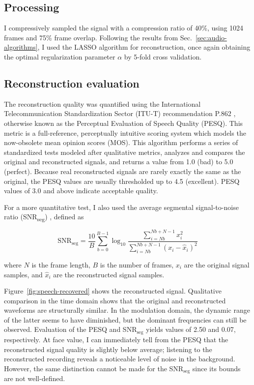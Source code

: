 \subsection{Processing}
\label{ssec:audio-speech-process}
I compressively sampled the signal with a compression ratio of 40\%, using 1024 frames and 75\% frame overlap. Following the results from Sec.~\ref{sec:audio-algorithms}, I used the LASSO algorithm for reconstruction, once again obtaining the optimal regularization parameter $\alpha$ by 5-fold cross validation.

\subsection{Reconstruction evaluation}
\label{ssec:audio-speech-metric}
The reconstruction quality was quantified using the International Telecommunication Standardization Sector (ITU-T) recommendation P.862 \cite{pesq}, otherwise known as the Perceptual Evaluation of Speech Quality (PESQ). This metric is a full-reference, perceptually intuitive scoring system which models the now-obsolete mean opinion scores (MOS). This algorithm performs a series of standardized tests modeled after qualitative metrics, analyzes and compares the original and reconstructed signals, and returns a value from 1.0 (bad) to 5.0 (perfect). Because real reconstructed signals are rarely exactly the same as the original, the PESQ values are usually thresholded up to 4.5 (excellent). PESQ values of 3.0 and above indicate acceptable quality.

For a more quantitative test, I also used the average segmental signal-to-noise ratio (SNR\textsubscript{seg}) \cite{Loizou2013}, defined as

\begin{equation}
	\label{eq:snrseg}
	\mathrm{SNR_{seg}} = \frac{10}{B} \sum_{b=0}^{B-1} \log_{10} \frac{\sum_{i = Nb}^{Nb + N - 1} x_i^2}{\sum_{i = Nb}^{Nb + N - 1} (x_i - \hat{x}_i)^2}
\end{equation}

\noindent where $N$ is the frame length, $B$ is the number of frames, $x_i$ are the original signal samples, and $\hat{x}_i$ are the reconstructed signal samples.

Figure~\ref{fig:speech-recovered} shows the reconstructed signal. Qualitative comparison in the time domain shows that the original and reconstructed waveforms are structurally similar. In the modulation domain, the dynamic range of the latter seems to have diminished, but the dominant frequencies can still be observed. Evaluation of the PESQ and SNR$_\mathrm{seg}$ yields values of 2.50 and 0.07, respectively. At face value, I can immediately tell from the PESQ that the reconstructed signal quality is slightly below average; listening to the reconstructed recording reveals a noticeable level of noise in the background. However, the same distinction cannot be made for the SNR$_\mathrm{seg}$ since its bounds are not well-defined.

